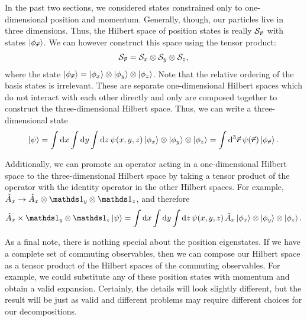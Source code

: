 In the past two sections, we considered states constrained only to one-dimensional position and momentum.
Generally, though, our particles live in three dimensions.
Thus, the Hilbert space of position states is really $\mathcal{S}_{\va*{r}}$ with states $\ket{\phi_{\va*{r}}}$.
We can however construct this space using the tensor product:
\begin{eqnarray}
    \mathcal{S}_{\va*{r}} = \mathcal{S}_{x} \otimes \mathcal{S}_{y} \otimes \mathcal{S}_{z}
,\end{eqnarray}
where the state $\ket{\phi_{\va*{r}}} = \ket{\phi_{x}} \otimes \ket{\phi_{y}} \otimes \ket{\phi_{z}}$.
Note that the relative ordering of the basis states is irrelevant.
These are separate one-dimensional Hilbert spaces which do not interact with each other directly and only are composed together to construct the three-dimensional Hilbert space.
Thus, we can write a three-dimensional state
\begin{eqnarray}
    \ket{\psi} = \int \dd{x} \int \dd{y} \int \dd{z} \psi(x,y,z) \ket{\phi_{x}} \otimes \ket{\phi_{y}} \otimes \ket{\phi_{z}} = \int \dd[3]{\va*{r}} \psi(\va*{r}) \ket{\phi_{\va*{r}}}
.\end{eqnarray}

Additionally, we can promote an operator acting in a one-dimensional Hilbert space to the three-dimensional Hilbert space by taking a tensor product of the operator with the identity operator in the other Hilbert spaces.
For example, $\hat{A}_{x} \rightarrow \hat{A}_{x} \otimes \id_{y} \otimes \id_{z}$, and therefore
\begin{eqnarray}
    \hat{A}_{x} \times \id_{y} \otimes \id_{z} \ket{\psi} = \int \dd{x} \int \dd{y} \int \dd{z} \psi(x,y,z) \, \hat{A}_{x} \ket{\phi_{x}} \otimes \ket{\phi_{y}} \otimes \ket{\phi_{z}}
.\end{eqnarray}

As a final note, there is nothing special about the position eigenstates.
If we have a complete set of commuting observables, then we can compose our Hilbert space as a tensor product of the Hilbert spaces of the commuting observables.
For example, we could substitute any of these position states with momentum and obtain a valid expansion.
Certainly, the details will look slightly different, but the result will be just as valid and different problems may require different choices for our decompositions.











